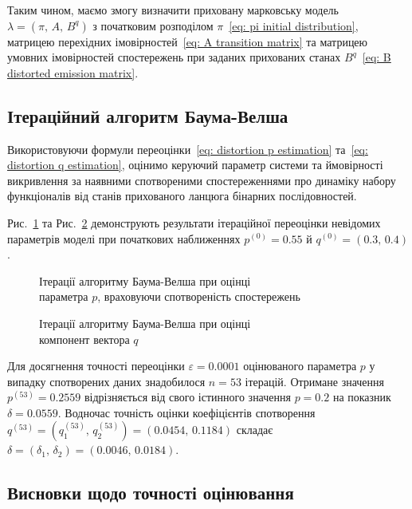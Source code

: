 Таким чином, маємо змогу визначити приховану марковську модель $\lambda=\left( \pi,\,A,\,B^q \right)$ з початковим розподілом $\pi$~\eqref{eq: pi initial distribution}, матрицею перехідних імовірностей~\eqref{eq: A transition matrix} та матрицею умовних імовірностей спостережень при заданих прихованих станах $B^q$~\eqref{eq: B distorted emission matrix}.

\subsection{Ітераційний алгоритм Баума-Велша}

Використовуючи формули переоцінки~\eqref{eq: distortion p estimation} та~\eqref{eq: distortion q estimation}, оцінимо керуючий параметр системи та ймовірності викривлення за наявними спотвореними спостереженнями про динаміку набору функціоналів від станів прихованого ланцюга бінарних послідовностей. 

Рис.~\ref{pic: p distortion estimation} та Рис.~\ref{pic: q distortion estimation} демонструють результати ітераційної переоцінки невідомих параметрів моделі при початкових наближеннях $p^{(0)}=0.55$ й $q^{(0)}=(0.3,\,0.4)$. 

\begin{figure}[H]\centering
    \setfontsize{14pt}
    
    \caption{Ітерації алгоритму Баума-Велша при оцінці \\ параметра $p$, враховуючи спотвореність спостережень}
    \label{pic: p distortion estimation}
\end{figure}

\begin{figure}[H]\centering
    \setfontsize{14pt}
    
    \caption{Ітерації алгоритму Баума-Велша при оцінці \\ компонент вектора $q$}
    \label{pic: q distortion estimation}
\end{figure}

Для досягнення точності переоцінки $\varepsilon=0.0001$ оцінюваного параметра $p$ у випадку спотворених даних знадобилося $n=53$ ітерацій. Отримане значення $p^{(53)}=0.2559$ відрізняється від свого істинного значення $p=0.2$ на показник $\delta=0.0559$. Водночас точність оцінки коефіцієнтів спотворення $q^{(53)} = \left( q^{(53)}_1,\,q^{(53)}_2 \right) = (0.0454,\,0.1184)$ складає $\delta=(\delta_1,\,\delta_2)=(0.0046,\,0.0184)$.

\subsection{Висновки щодо точності оцінювання}

